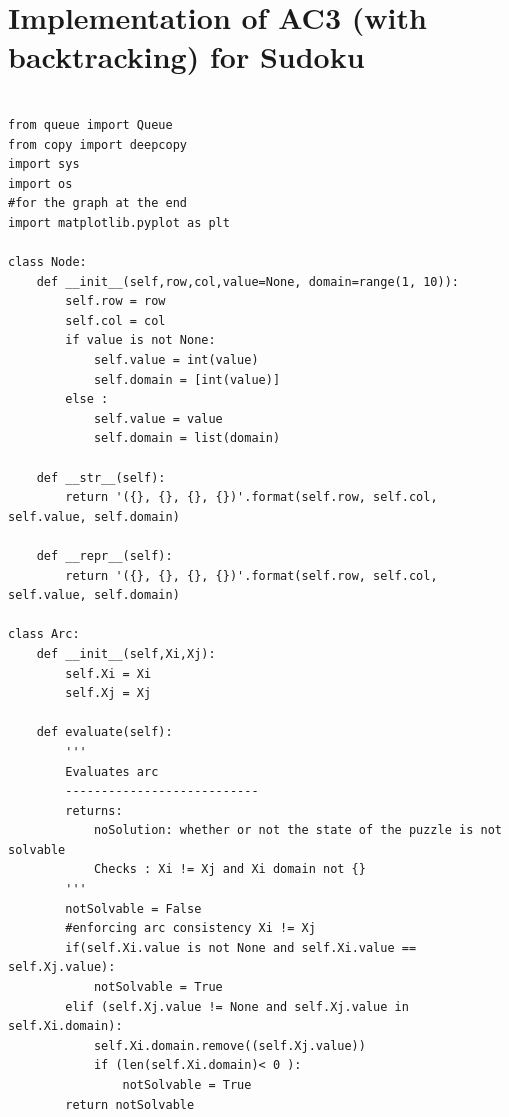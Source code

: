 \documentclass{article}
\begin{document}
\newpage
\section{Implementation of AC3 (with backtracking) for Sudoku }
\begin{verbatim}

from queue import Queue
from copy import deepcopy
import sys
import os
#for the graph at the end
import matplotlib.pyplot as plt

class Node:
    def __init__(self,row,col,value=None, domain=range(1, 10)):
        self.row = row
        self.col = col
        if value is not None: 
            self.value = int(value)
            self.domain = [int(value)]
        else : 
            self.value = value
            self.domain = list(domain)
        
    def __str__(self):
        return '({}, {}, {}, {})'.format(self.row, self.col, self.value, self.domain)

    def __repr__(self):
        return '({}, {}, {}, {})'.format(self.row, self.col, self.value, self.domain)

class Arc: 
    def __init__(self,Xi,Xj):
        self.Xi = Xi
        self.Xj = Xj 

    def evaluate(self):
        '''
        Evaluates arc
        ---------------------------
        returns:
            noSolution: whether or not the state of the puzzle is not solvable
            Checks : Xi != Xj and Xi domain not {}
        '''
        notSolvable = False 
        #enforcing arc consistency Xi != Xj 
        if(self.Xi.value is not None and self.Xi.value == self.Xj.value):
            notSolvable = True 
        elif (self.Xj.value != None and self.Xj.value in self.Xi.domain):
            self.Xi.domain.remove((self.Xj.value))
            if (len(self.Xi.domain)< 0 ): 
                notSolvable = True
        return notSolvable
\end{verbatim}
\newpage
\end{document}
